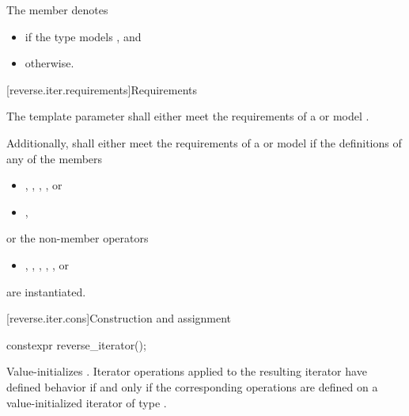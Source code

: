 \pnum
The member   denotes
\begin{itemize}
\item
{} if
the type
 models
, and
\item
{} otherwise.
\end{itemize}

[reverse.iter.requirements]{Requirements}

\pnum
The template parameter
shall either meet the requirements of a
or model
.

\pnum
Additionally,
shall either meet the requirements of a
or model
if the definitions of any of the members
\begin{itemize}
\item
{},
,
,
, or
\item
{},
\end{itemize}
or the non-member operators
\begin{itemize}
\item
{},
,
,
,
,
or
\end{itemize}
are instantiated.

[reverse.iter.cons]{Construction and assignment}

%
\begin{itemdecl}
constexpr reverse_iterator();
\end{itemdecl}

\begin{itemdescr}
\pnum
\effects
Value-initializes
.
Iterator operations applied to the resulting iterator have defined behavior
if and only if the corresponding operations are defined on a value-initialized iterator of type
.
\end{itemdescr}

